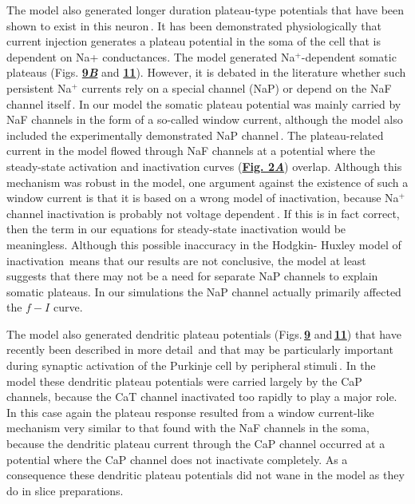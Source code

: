 \documentclass[12pt]{article}
\begin{document}
The model also generated longer duration plateau-type
potentials that have been shown to
exist in this neuron\,\cite{Jaeger:1991kh, R:1980pi, Llinas:1992rq}. 
It has been demonstrated physiologically
that current injection generates a plateau potential
in the soma of the cell that is dependent on Na+ conductances.
The model generated Na$^+$-dependent somatic
plateaus (Figs. \href{../pub-purkinje-deschutter1-fig-9/pub-purkinje-deschutter1-fig-9.tex}{\bf 9{\it B}} and \href{../pub-purkinje-deschutter1-fig-11/pub-purkinje-deschutter1-fig-11.tex}{\bf 11}). However, it is debated in the
literature whether such persistent Na$^+$ currents rely on a
special channel (NaP) or depend on the NaF channel itself\,\cite{Alzheimer:1993fk, C-R-French:1990uq, Kay:1990kx}.
In our model the somatic plateau potential was mainly
carried by NaF channels in the form of a so-called window
current, although the model also included the experimentally
demonstrated NaP channel\,\cite{Kay:1990kx}. The
plateau-related current in the model flowed through NaF
channels at a potential where the steady-state activation
and inactivation curves (\href{../pub-purkinje-deschutter1-conductance1-naf1/pub-purkinje-deschutter1-conductance1-naf1.tex}{\bf Fig. 2{\it A}}) overlap. Although this
mechanism was robust in the model, one argument against
the existence of such a window current is that it is based on
a wrong model of inactivation, because Na$^+$ channel inactivation
is probably not voltage dependent\,\cite{Aldrich:1987uq}. 
If this is in fact correct, then the term in our
equations for steady-state inactivation would be meaningless.
Although this possible inaccuracy in the Hodgkin-
Huxley model of inactivation\,\cite{hodgkin52:_quantitative_description} means that our results
are not conclusive, the model at least suggests that there
may not be a need for separate NaP channels to explain
somatic plateaus. In our simulations the NaP channel actually
primarily affected the $f-I$ curve.

The model also generated dendritic plateau potentials
(Figs.\,\href{../pub-purkinje-deschutter1-fig-9/pub-purkinje-deschutter1-fig-9.tex}{\bf 9} and\,\href{../pub-purkinje-deschutter1-fig-11/pub-purkinje-deschutter1-fig-11.tex}{\bf 11}) that have recently been described in more
detail\,\cite{Jaeger:1991kh} and that may be particularly
important during synaptic activation of the Purkinje
cell by peripheral stimuli\,\cite{Thompson:1991ac}. In
the model these dendritic plateau potentials were carried
largely by the CaP channels, because the CaT channel inactivated
too rapidly to play a major role. In this case again
the plateau response resulted from a window current-like
mechanism very similar to that found with the NaF channels
in the soma, because the dendritic plateau current
through the CaP channel occurred at a potential where the
CaP channel does not inactivate completely. As a consequence
these dendritic plateau potentials did not wane in
the model as they do in slice preparations.



\end{document}
